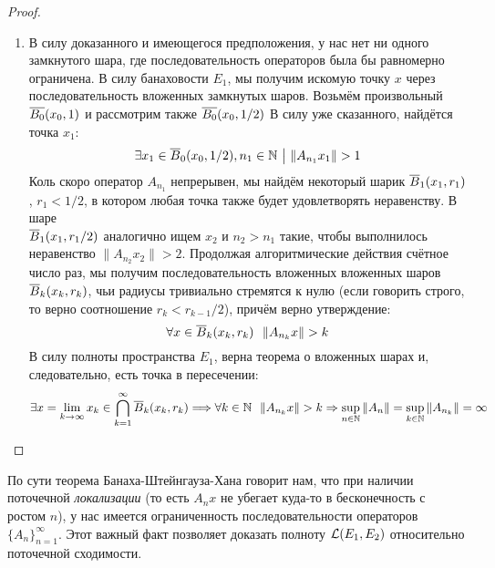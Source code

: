 \begin{proof}
\begin{enumerate}
		\item В силу доказанного и имеющегося предположения, у нас нет ни одного замкнутого шара, где последовательность операторов была бы равномерно ограничена. В силу банаховости $E_1$, мы получим искомую точку $x$ через последовательность вложенных замкнутых шаров. Возьмём произвольный $\overline{B_0}(x_0, 1)$ и рассмотрим также $\overline{B_0}(x_0, 1 / 2)$ В силу уже сказанного, найдётся точка $x_1$:
		\[
			\exists x_1 \in \overline{B}_0(x_0, 1 / 2), n_1 \in \mathbb{N} \ \big|\  \|A_{n_1}x_1\| > 1
		\]
		Коль скоро оператор $A_{n_1}$ непрерывен, мы найдём некоторый шарик $\overline{B}_1(x_1, r_1)$, $r_1 < 1 / 2$, в котором любая точка также будет удовлетворять неравенству. В шаре \\ $\overline{B}_1(x_1, r_1 / 2)$ аналогично ищем $x_2$ и $n_2 > n_1$ такие, чтобы выполнилось неравенство $\|A_{n_2}x_2\| > 2$. Продолжая алгоритмические действия счётное число раз, мы получим последовательность вложенных вложенных шаров $\overline{B}_k(x_k, r_k)$, чьи радиусы тривиально стремятся к нулю (если говорить строго, то верно соотношение $r_k < r_{k - 1} / 2$), причём верно утверждение:
		\[
			\forall x \in \overline{B}_k(x_k, r_k)\ \ \|A_{n_k}x\| > k
		\]
		В силу полноты пространства $E_1$, верна теорема о вложенных шарах и, следовательно, есть точка в пересечении:
		\[
			\exists x = \lim_{k \to \infty} x_k \in \bigcap_{k = 1}^\infty \overline{B}_k(x_k, r_k) \Longrightarrow \forall k \in \mathbb{N}\ \ \|A_{n_k}x\| > k \Rightarrow \sup_{n \in \mathbb{N}} \|A_n\| = \sup_{k \in \mathbb{N}} \|A_{n_k}\| = \infty
		\]
	\end{enumerate}
\end{proof}

\begin{anote}
	По сути теорема Банаха-Штейнгауза-Хана говорит нам, что при наличии поточечной \textit{локализации} (то есть $A_nx$ не убегает куда-то в бесконечность с ростом $n$), у нас имеется ограниченность последовательности операторов $\{A_n\}_{n = 1}^\infty$. Этот важный факт позволяет доказать полноту $\mathcal{L}(E_1, E_2)$ относительно поточечной сходимости.
\end{anote}
